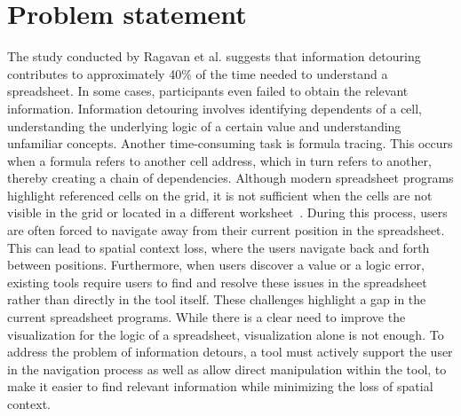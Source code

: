 \section{Problem statement}
\label{sec:problem-statement}
The study conducted by Ragavan et al. suggests that information detouring contributes to approximately 40\% of the time needed to understand a spreadsheet. In some cases, participants even failed to obtain the relevant information. Information detouring involves identifying dependents of a cell, understanding the underlying logic of a certain value and understanding unfamiliar concepts. Another time-consuming task is formula tracing. This occurs when a formula refers to another cell address, which in turn refers to another, thereby creating a chain of dependencies. Although modern spreadsheet programs highlight referenced cells on the grid, it is not sufficient when the cells are not visible in the grid or located in a different worksheet~\cite{srinivasa_ragavan_spreadsheet_2021}. During this process, users are often forced to navigate away from their current position in the spreadsheet. This can lead to spatial context loss, where the users navigate back and forth between positions. Furthermore, when users discover a value or a logic error, existing tools require users to find and resolve these issues in the spreadsheet rather than directly in the tool itself. 
These challenges highlight a gap in the current spreadsheet programs. While there is a clear need to improve the visualization for the logic of a spreadsheet, visualization alone is not enough. To address the problem of information detours, a tool must actively support the user in the navigation process as well as allow direct manipulation within the tool, to make it easier to find relevant information while minimizing the loss of spatial context.



